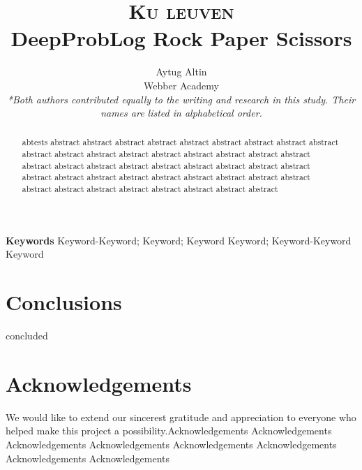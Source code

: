 \documentclass[10pt,letterpaper]{article}
\title{
		\usefont{OT1}{bch}{b}{n}
		\normalfont \normalsize \textsc{Ku leuven} \\ [10pt]
		\huge DeepProbLog Rock Paper Scissors\\
}
\author[0]{Aytug Altin \\
		Webber Academy \\
        \textit{*Both authors contributed equally to the writing and research in this study. Their names are listed in alphabetical order.}}
\begin{document}
\maketitle

\begin{abstract}
	abtests abstract abstract abstract abstract abstract abstract abstract abstract abstract abstract abstract abstract abstract abstract abstract abstract abstract abstract abstract abstract abstract abstract abstract abstract abstract abstract abstract abstract abstract abstract abstract abstract abstract abstract abstract abstract abstract abstract abstract abstract abstract abstract abstract abstract
\end{abstract}
{\textbf{Keywords}
Keyword-Keyword; Keyword; Keyword Keyword; Keyword-Keyword Keyword}









\section*{Conclusions}
concluded


\section*{Acknowledgements}
We would like to extend our sincerest gratitude and appreciation to everyone who helped make this project a possibility.Acknowledgements Acknowledgements Acknowledgements Acknowledgements Acknowledgements Acknowledgements Acknowledgements Acknowledgements


{}
\end{document}
